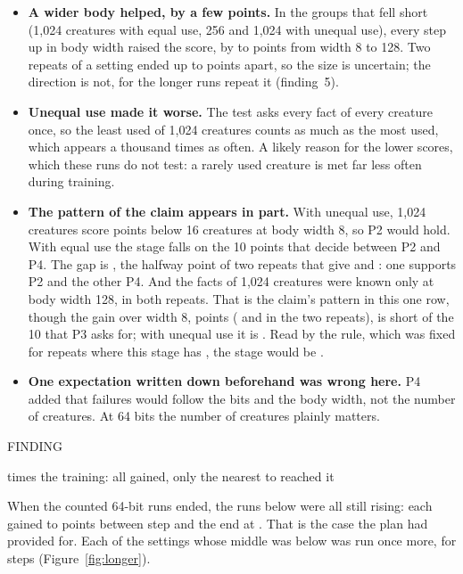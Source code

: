 \documentclass[10pt,letterpaper]{article}
\newcommand{\smallcaps}[1]{{\sffamily\fontsize{7.6}{9}\selectfont\color{second}\addfontfeature{LetterSpace=7}#1}}
\newcommand{\labelled}[2]{%
  \vspace{12pt plus 3pt minus 2pt}%
  \smallcaps{#1}\par\nopagebreak\vspace{-2pt}%
  {\sffamily\bfseries\fontsize{12.5}{15.5}\selectfont\raggedright #2\par}%
  \nopagebreak\vspace{1pt}}
\newcounter{finding}
\newcommand{\finding}[1]{\refstepcounter{finding}\labelled{FINDING \thefinding}{#1}}
\newcommand{\lead}[1]{\textbf{#1}}               %
\begin{document}
\begin{itemize}
\item \lead{A wider body helped, by a few points.} In the \LowGroupsWord{} groups that fell short (1,024
      creatures with equal use, 256 and 1,024 with unequal use), every step up in body width raised
      the score, by \BodyRiseLow{} to \BodyRiseHigh{} points from width 8 to 128. Two repeats of a
      setting ended up to \RepeatSpreadHigh{} points apart, so the size is uncertain; the direction
      is not, for the longer runs repeat it (finding~5).
\item \lead{Unequal use made it worse.} The test asks every fact of every creature once, so the
      least used of 1,024 creatures counts as much as the most used, which appears a thousand
      times as often. A likely reason for the lower scores, which these runs do not test: a rarely
      used creature is met far less often during training.
\item \lead{The pattern of the claim appears in part.} With unequal use, 1,024 creatures score
      \GapUnequalSixtyFour{} points below 16 creatures at body width 8, so P2 would hold. With equal
      use the stage falls on the 10 points that decide between P2 and P4. The gap is
      \GapEqualSixtyFour, the halfway point of two repeats that give \GapEqualRepeatHigh{} and
      \GapEqualRepeatLow: one supports P2 and the other P4. And the facts of 1,024 creatures were
      known only at body width 128, in both repeats. That is the claim's pattern in this one row,
      though the gain over width 8, \BodyGainEqualSixtyFour{} points (\BodyGainEqualRepeatHigh{}
      and \BodyGainEqualRepeatLow{} in the two repeats), is short of the 10 that P3 asks for; with
      unequal use it is \BodyGainUnequalSixtyFour. Read by the rule, which was fixed for \RepeatsEightWord{} repeats where this stage has
      \RepeatsSixtyFourWord, the stage would be \emph{\VerdictSixtyFour}.
\item \lead{One expectation written down beforehand was wrong here.} P4 added that failures would
      follow the bits and the body width, not the number of creatures. At 64 bits the number of
      creatures plainly matters.
\end{itemize}

\finding{\LongerTimesWordCap{} times the training: all \RunsLongerWord{} gained, only the \LongerReachedWord{} nearest to \KnownBar{} reached it}

When the counted 64-bit runs ended, the \RunsBelowSixtyFour{} runs below \KnownBar{} were all still rising:
each gained \LateGainLow{} to \LateGainHigh{} points between step \StepsLate{} and the end at
\StepsSixtyFour. That is the case the plan had provided for. Each of the \SettingsBelow{} settings
whose middle was below \KnownBar{} was run once more, for \StepsLonger{} steps (Figure~\ref{fig:longer}).
\end{document}
